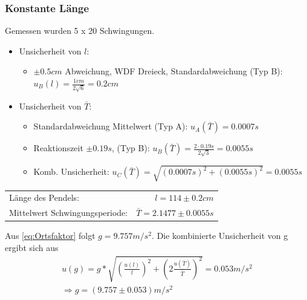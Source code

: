 \documentclass[
	a4paper,
	12pt,
	pagesize,
	ngerman
]{scrartcl}
\begin{document}
	\subsubsection{Konstante Länge}
	Gemessen wurden 5 x 20 Schwingungen.
	\begin{itemize}
		\item Unsicherheit von \(l\): 
			\begin{itemize}
				\item $\pm0.5\si{cm}$ Abweichung, WDF Dreieck, Standardabweichung (Typ B): \( u_B(l) = \frac{1\si{cm}}{2\sqrt{6}} = 0.2\si{cm} \)
			\end{itemize}

		\item Unsicherheit von \(\bar{T}\): 
			\begin{itemize}
				\item Standardabweichung Mittelwert (Typ A): \( u_A(\bar{T}) = 0.0007\si{s} \)
				\item Reaktionszeit  $\pm0.19 \si{s}$, (Typ B): \( u_B(\bar{T}) = \frac{2\cdot0.19\si{s}}{2\sqrt{3}} = 0.0055\si{s} \)
				\item Komb. Unsicherheit: $ u_C(\bar{T}) = \sqrt{(0.0007\si{s})^2+(0.0055\si{s})^2} = 0.0055 \si{s} $
			\end{itemize}
	\end{itemize}

	\begin{tabular}{l r}
		Länge des Pendels: & \(l = 114 \pm 0.2\si{cm} \) \\
		Mittelwert Schwingungsperiode: & \(\bar{T} = 2.1477 \pm 0.0055\si{s} \) \\
	\end{tabular} 
	

	\par

	\noindent Aus \eqref{eq:Ortsfaktor} folgt $ g = 9.757  \si{m/s^2}$. Die kombinierte Unsicherheit von g ergibt sich aus
	\begin{align*}
		u(g) = g * \sqrt{\left(\frac{u(l)}{l}\right)^2 + \left(2\frac{u(\bar{T})}{\bar{T}}\right)^2} = 0.053 \si{m/s^2} \\
		\Rightarrow{} g = (9.757 \pm 0.053) \si{m/s^2}
	\end{align*}
	

	\newpage
\end{document}
